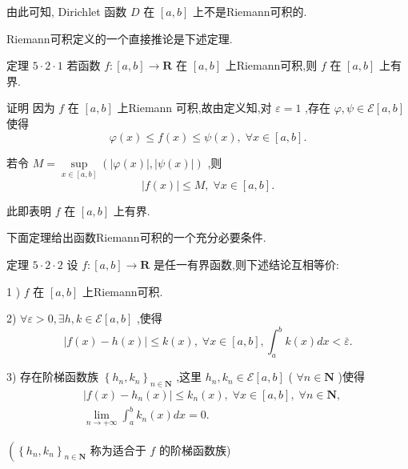 由此可知, Dirichlet 函数 $D$ 在 $\left\lbrack  {a,b}\right\rbrack$ 上不是Riemann可积的.

Riemann可积定义的一个直接推论是下述定理.

定理 $5 \cdot  2 \cdot  1$ 若函数 $f : \left\lbrack  {a,b}\right\rbrack   \rightarrow  \mathbf{R}$ 在 $\left\lbrack  {a,b}\right\rbrack$ 上Riemann可积,则 $f$ 在 $\left\lbrack  {a,b}\right\rbrack$ 上有界.

证明 因为 $f$ 在 $\left\lbrack  {a,b}\right\rbrack$ 上Riemann 可积,故由定义知,对 $\varepsilon  = 1$ ,存在 $\varphi ,\psi  \in  \mathcal{E}\left\lbrack  {a,b}\right\rbrack$ 使得
$$\varphi \left( x\right)  \leq  f\left( x\right)  \leq  \psi \left( x\right) ,\;\forall x \in  \left\lbrack  {a,b}\right\rbrack  .$$

若令 $M = \mathop{\sup }\limits_{{x \in  \left\lbrack  {a,b}\right\rbrack  }}\left( {\left| {\varphi \left( x\right) }\right| ,\left| {\psi \left( x\right) }\right| }\right)$ ,则
$$\left| {f\left( x\right) }\right|  \leq  M,\;\forall x \in  \left\lbrack  {a,b}\right\rbrack  .$$

此即表明 $f$ 在 $\left\lbrack  {a,b}\right\rbrack$ 上有界.

下面定理给出函数Riemann可积的一个充分必要条件.

定理 $5 \cdot  2 \cdot  2$ 设 $f : \left\lbrack  {a,b}\right\rbrack   \rightarrow  \mathbf{R}$ 是任一有界函数,则下述结论互相等价:

1 ) $f$ 在 $\left\lbrack  {a,b}\right\rbrack$ 上Riemann可积.

2) $\forall \varepsilon  > 0,\exists h,k \in  \mathcal{E}\left\lbrack  {a,b}\right\rbrack$ ,使得
$$\left| {f\left( x\right)  - h\left( x\right) }\right|  \leq  k\left( x\right) ,\;\forall x \in  \left\lbrack  {a,b}\right\rbrack  ,{\int }_{a}^{b}k\left( x\right) {dx} < \bar{\varepsilon }.$$

3) 存在阶梯函数族 ${\left\{  {h}_{n},{k}_{n}\right\}  }_{n \in  \mathbf{N}}$ ,这里 ${h}_{n},{k}_{n} \in  \mathcal{E}\left\lbrack  {a,b}\right\rbrack$ ( $\forall n \in  \mathbf{N}$ )使得
\begin{align*}
	&\left| {f\left( x\right)  - {h}_{n}\left( x\right) }\right|  \leq  {k}_{n}\left( x\right) ,\;\forall x \in  \left\lbrack  {a,b}\right\rbrack  ,\;\forall n \in  \mathbf{N},\\
	&\mathop{\lim }\limits_{{n \rightarrow   + \infty }}{\int }_{a}^{b}{k}_{n}\left( x\right) {dx} = 0.
\end{align*}

$\left( {\left\{  {h}_{n},{k}_{n}\right\}  }_{n \in  \mathbf{N}}\right.$ 称为适合于 $f$ 的阶梯函数族)

